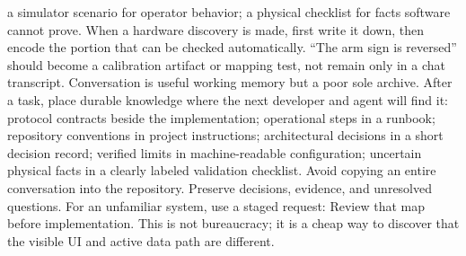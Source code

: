 \markdownRendererUlItem a simulator scenario for operator behavior;\markdownRendererUlItemEnd 
\markdownRendererUlItem a physical checklist for facts software cannot prove.\markdownRendererUlItemEnd 
\markdownRendererUlEnd \markdownRendererInterblockSeparator
{}When a hardware discovery is made, first write it down, then encode the portion\markdownRendererSoftLineBreak
{}that can be checked automatically. “The arm sign is reversed” should become a\markdownRendererSoftLineBreak
{}calibration artifact or mapping test, not remain only in a chat transcript.\markdownRendererInterblockSeparator
{}
\markdownRendererSectionEnd \markdownRendererSectionBegin
{}\markdownRendererInterblockSeparator
{}Conversation is useful working memory but a poor sole archive. After a task,\markdownRendererSoftLineBreak
{}place durable knowledge where the next developer and agent will find it:\markdownRendererInterblockSeparator
{}\markdownRendererUlBegin
\markdownRendererUlItem protocol contracts beside the implementation;\markdownRendererUlItemEnd 
\markdownRendererUlItem operational steps in a runbook;\markdownRendererUlItemEnd 
\markdownRendererUlItem repository conventions in project instructions;\markdownRendererUlItemEnd 
\markdownRendererUlItem architectural decisions in a short decision record;\markdownRendererUlItemEnd 
\markdownRendererUlItem verified limits in machine-readable configuration;\markdownRendererUlItemEnd 
\markdownRendererUlItem uncertain physical facts in a clearly labeled validation checklist.\markdownRendererUlItemEnd 
\markdownRendererUlEnd \markdownRendererInterblockSeparator
{}Avoid copying an entire conversation into the repository. Preserve decisions,\markdownRendererSoftLineBreak
{}evidence, and unresolved questions.\markdownRendererInterblockSeparator
{}
\markdownRendererSectionEnd \markdownRendererSectionBegin
{}\markdownRendererInterblockSeparator
{}For an unfamiliar system, use a staged request:\markdownRendererInterblockSeparator
{}\markdownRendererInterblockSeparator
{}Review that map before implementation. This is not bureaucracy; it is a cheap\markdownRendererSoftLineBreak
{}way to discover that the visible UI and active data path are different.\markdownRendererInterblockSeparator
{}
\markdownRendererSectionEnd \markdownRendererSectionBegin
